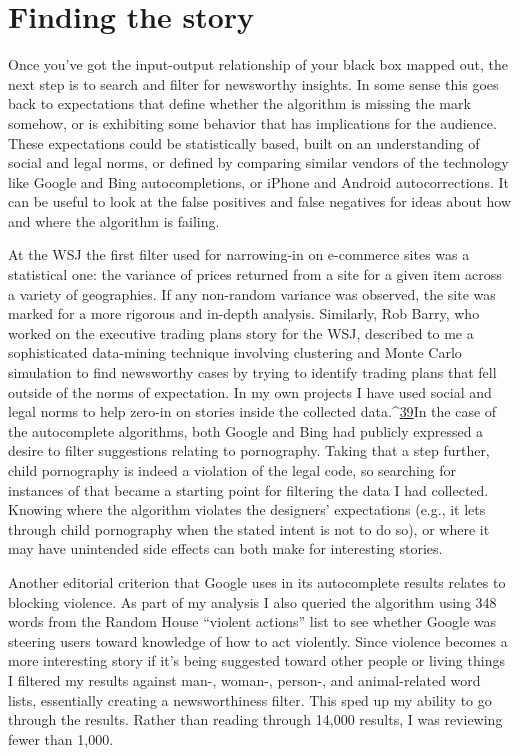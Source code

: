 \section{Finding the story }
Once you've got the input-output relationship of your black box mapped out, the next step is to search and filter for newsworthy insights. In some sense this goes back to expectations that define whether the algorithm is missing the mark somehow, or is exhibiting some behavior that has implications for the audience. These expectations could be statistically based, built on an understanding of social and legal norms, or defined by comparing similar vendors of the technology like Google and Bing autocompletions, or iPhone and Android autocorrections. It can be useful to look at the false positives and false negatives for ideas about how and where the algorithm is failing. 

At the WSJ the first filter used for narrowing-in on e-commerce sites was a statistical one: the variance of prices returned from a site for a given item across a variety of geographies. If any non-random variance was observed, the site was marked for a more rigorous and in-depth analysis. Similarly, Rob Barry, who worked on the executive trading plans story for the WSJ, described to me a sophisticated data-mining technique involving clustering and Monte Carlo simulation to find newsworthy cases by trying to identify trading plans that fell outside of the norms of expectation. 
In my own projects I have used social and legal norms to help zero-in on stories inside the collected data.^{\href{#endnotes}{39}}In the case of the autocomplete algorithms, both Google and Bing had publicly expressed a desire to filter suggestions relating to pornography. Taking that a step further, child pornography is indeed a violation of the legal code, so searching for instances of that became a starting point for filtering the data I had collected. Knowing where the algorithm violates the designers' expectations (e.g., it lets through child pornography when the stated intent is not to do so), or where it may have unintended side effects can both make for interesting stories. 

Another editorial criterion that Google uses in its autocomplete results relates to blocking violence. As part of my analysis I also queried the algorithm using 348 words from the Random House ``violent actions'' list to see whether Google was steering users toward knowledge of how to act violently. Since violence becomes a more interesting story if it's being suggested toward other people or living things I filtered my results against man-, woman-, person-, and animal-related word lists, essentially creating a newsworthiness filter. This sped up my ability to go through the results. Rather than reading through 14,000 results, I was reviewing fewer than 1,000. 


